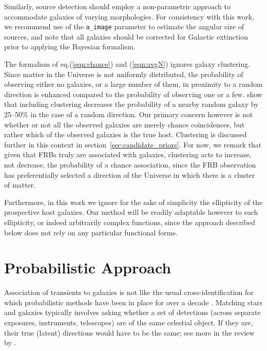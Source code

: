 \documentclass[twocolumn,linenumbers]{aastex63}
\newcommand{\stcomment}[1]{\footnote{[SPT comment: {\color{purple} #1 }]}} %
\begin{document}
Similarly, source detection should employ a non-parametric approach to accommodate galaxies of varying morphologies. For consistency with this work, we recommend use of the {\texttt{a\_image}} parameter to estimate the angular size of sources, and note that all galaxies should be corrected for Galactic extinction prior to applying the Bayesian formalism. 




The formalism of eq.(\ref{eqn:chance}) and (\ref{eqn:avgN}) ignores galaxy clustering. Since matter in the Universe is not uniformly distributed, the probability of observing either no galaxies, or a large number of them, in proximity to a random direction is enhanced compared to the probability of observing one or a few. \citet{Tunnicliffe14} show that including clustering decreases the probability of a nearby random galaxy by 25--50\% in the case of a random direction. Our primary concern however is not whether or not all the observed galaxies are merely chance coincidences, but rather which of the observed galaxies is the true host.
Clustering is discussed further in this context in section~\ref{sec:candidate_priors}. For now, we remark that given that FRBs truly are associated with galaxies, clustering acts to increase, not decrease, the probability of a chance association, since the FRB observation has preferentially selected a direction of the Universe in which there is a cluster of matter.

Furthermore, in this work we ignore for the sake of simplicity the ellipticity of the prospective host galaxies. 
Our method will be readily adaptable however to such ellipticity, or indeed arbitrarily complex functions, since the approach described below does not rely on any particular functional forms.

\section{Probabilistic Approach} \label{sec:bayesian}

Association of transients
to galaxies is not like the usual cross-identification for which probabilistic methods have been in place for over a decade \citep{budavari_szalay_2008}. 
Matching stars and galaxies typically involves asking whether a set of detections (across separate exposures, instruments, telescopes) are of the same celestial object. 
If they are, their true (latent) directions would have to be the same; see more in the review by \citet{budavari_loredo_2015}. 
\end{document}
